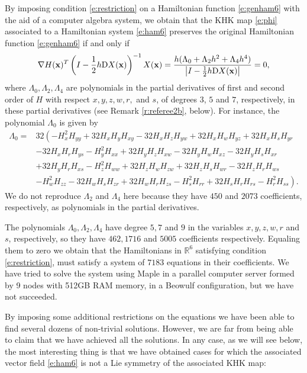 \documentclass[11pt]{article}
\newcommand{\R}{{\mathbb R}}
\begin{document}
By imposing condition \eqref{e:restriction} on a  Hamiltonian function \eqref{e:genham6}
with the aid of a computer algebra system, we obtain that the KHK map \eqref{e:phi} associated to a Hamiltonian system \eqref{e:ham6} preserves the original Hamiltonian function \eqref{e:genham6} if and only if
\begin{equation}\label{e:lambdesr6}
\nabla H({\bf{x}})^T \left(I-\frac{1}{2}h{\mathrm D}X({\bf{x}})\right)^{-1}X({\bf{x}})=\frac{h(\Lambda_0+\Lambda_2 h^2+\Lambda_4 h^4)}{\left|I-\frac{1}{2}h {\mathrm D}X({\bf{x}})\right|}=0,
\end{equation}
where $\Lambda_0,\Lambda_2,\Lambda_4$ are polynomials in the partial derivatives of first and second order of $H$ with respect $x,y,z,w,r,$ and $s$,
of degrees $3$, $5$ and $7$, respectively, in these partial derivatives (see Remark \ref{r:referee2b}, below). For instance, the polynomial $\Lambda_0$ is given by
\begin{align}\label{e:h0r6gen}
\Lambda_0= & 32\left( -  H_{x}^{2} H_{yy} + 32 H_{x} H_{y} H_{xy} - 32 H_{x} H_{z} H_{yw} + 32 H_{x} H_{w} H_{yz} + 32 H_{x} H_{s} H_{yr}\right. \nonumber\\
&- 32 H_{x} H_{r} H_{ys} -  H_{y}^{2} H_{xx} + 32 H_{y} H_{z} H_{xw} - 32 H_{y} H_{w} H_{xz} - 32 H_{y} H_{s} H_{xr} \\
&+ 32 H_{y} H_{r} H_{xs} -  H_{z}^{2} H_{ww} + 32 H_{z} H_{w} H_{zw} + 32 H_{z} H_{s} H_{wr} - 32 H_{z} H_{r} H_{ws}  \nonumber\\
&\left.-  H_{w}^{2} H_{zz} - 32 H_{w} H_{s} H_{zr}+ 32 H_{w} H_{r} H_{zs} -  H_{s}^{2} H_{rr} + 32 H_{s} H_{r} H_{rs} -  H_{r}^{2} H_{ss}\right).\nonumber
\end{align}
We do not reproduce $\Lambda_2$ and $\Lambda_4$ here because they have $450$ and $2073$ coefficients, respectively,  as polynomials in the partial derivatives.



The polynomials $\Lambda_0,\Lambda_2,\Lambda_4$ have degree $5,7$ and $9$ in the variables $x,y,z,w,r$ and $s$, respectively, so they have $462, 1716$ and $5005$ coefficients respectively.
Equaling them to zero we obtain that the Hamiltonians in $\R^6$ satisfying condition \eqref{e:restriction}, must satisfy a system of $7183$ equations in their coefficients.  We have tried to solve the system using Maple in a parallel computer server formed by 9 nodes with 512GB RAM memory, in a Beowulf configuration, but we have not succeeded.

By imposing some additional restrictions on the equations  we have been able to find several dozens of non-trivial solutions. However, we are far from being able to claim that we have achieved all the solutions. In any case, as we will see below, the most interesting thing is that we have obtained cases for which the associated vector field \eqref{e:ham6} is not a Lie symmetry of the associated KHK map:
\end{document}
